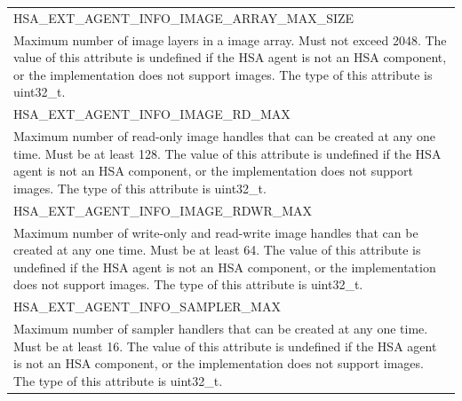 \documentclass[final,oneside]{book}
\newcommand{\reftyp}[1]{#1}
\newcommand{\refenu}[1]{\reftyp{#1}}
\begin{document}
\begin{longtable}{@{\hspace{2em}}p{\linewidth-2em}}
\hspace{-2em}\refenu{HSA_\-EXT_\-AGENT_\-INFO_\-IMAGE_\-ARRAY_\-MAX_\-SIZE}\\Maximum number of image layers in a image array. Must not exceed 2048. The value of this attribute is undefined if the HSA agent is not an HSA component, or the implementation does not support images. The type of this attribute is uint32_\-t.\\[2mm]
\hspace{-2em}\refenu{HSA_\-EXT_\-AGENT_\-INFO_\-IMAGE_\-RD_\-MAX}\\Maximum number of read-only image handles that can be created at any one time. Must be at least 128. The value of this attribute is undefined if the HSA agent is not an HSA component, or the implementation does not support images. The type of this attribute is uint32_\-t.\\[2mm]
\hspace{-2em}\refenu{HSA_\-EXT_\-AGENT_\-INFO_\-IMAGE_\-RDWR_\-MAX}\\Maximum number of write-only and read-write image handles that can be created at any one time. Must be at least 64. The value of this attribute is undefined if the HSA agent is not an HSA component, or the implementation does not support images. The type of this attribute is uint32_\-t.\\[2mm]
\hspace{-2em}\refenu{HSA_\-EXT_\-AGENT_\-INFO_\-SAMPLER_\-MAX}\\Maximum number of sampler handlers that can be created at any one time. Must be at least 16. The value of this attribute is undefined if the HSA agent is not an HSA component, or the implementation does not support images. The type of this attribute is uint32_\-t.
\end{longtable}
\end{document}
